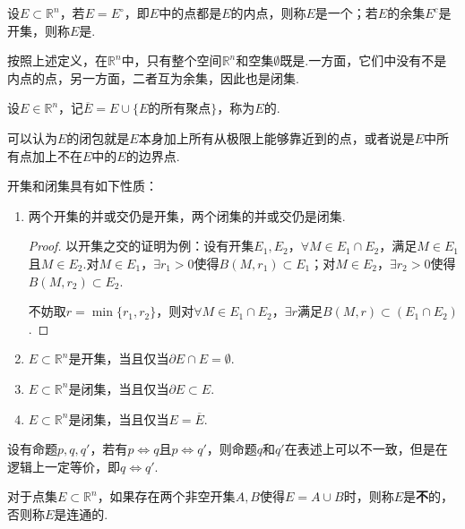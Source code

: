 \begin{definition}
    设$E \subset \mathbb{R}^n$，若$E = E^\circ$，即$E$中的点都是$E$的内点，则称$E$是一个；若$E$的余集$E^c$是开集，则称$E$是.
\end{definition}

按照上述定义，在$\mathbb{R}^n$中，只有整个空间$\mathbb{R}^n$和空集$\emptyset$既是.一方面，它们中没有不是内点的点，另一方面，二者互为余集，因此也是闭集.

\begin{definition}
    设$E \in \mathbb{R}^n$，记$\overline{E} = E \cup \{E\text{的所有聚点}\}$，称为$E$的.
\end{definition}
可以认为$E$的闭包就是$E$本身加上所有从极限上能够靠近到的点，或者说是$E$中所有点加上不在$E$中的$E$的边界点.

开集和闭集具有如下性质：
\begin{enumerate}[property]
    \item 两个开集的并或交仍是开集，两个闭集的并或交仍是闭集.
    \begin{proof}
        以开集之交的证明为例：设有开集$E_1,E_2$，$\forall M \in E_1 \cap E_2$，满足$M \in E_1$且$M \in E_2$.对$M \in E_1$，$\exists r_1 > 0$使得$B(M,r_1) \subset E_1$；对$M \in E_2$，$\exists r_2 > 0$使得$B(M,r_2) \subset E_2$.

        不妨取$r = \min\{r_1,r_2\}$，则对$\forall M \in E_1 \cap E_2$，$\exists r$满足$B(M,r) \subset (E_1 \cap E_2)$.
    \end{proof}
    \item $E\subset\mathbb{R}^n$是开集，当且仅当$\partial E \cap E = \emptyset$.
    \item $E\subset\mathbb{R}^n$是闭集，当且仅当$\partial E \subset E$.
    \item $E\subset\mathbb{R}^n$是闭集，当且仅当$E = \overline{E}$.
\end{enumerate}
\begin{mistake}
    设有命题$p,q,q'$，若有$p\Leftrightarrow q$且$p\Leftrightarrow q'$，则命题$q$和$q'$在表述上可以不一致，但是在逻辑上一定等价，即$q \Leftrightarrow q'$.
\end{mistake}

\begin{definition}
    对于点集$E \subset \mathbb{R}^n$，如果存在两个非空开集$A,B$使得$E = A \cup B$时，则称$E$是\textbf{不}\!\!的，否则称$E$是连通的.
\end{definition}


